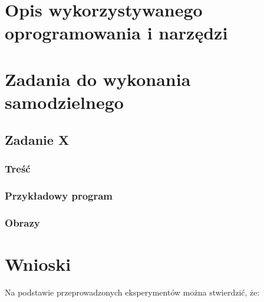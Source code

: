 \section{Opis wykorzystywanego oprogramowania i narzędzi}

\section{Zadania do wykonania samodzielnego}

\subsection{Zadanie X}

\subsubsection{Treść}

\subsubsection{Przykładowy program}

\subsubsection{Obrazy}

\section{Wnioski}

Na podstawie przeprowadzonych eksperymentów można stwierdzić, że:

